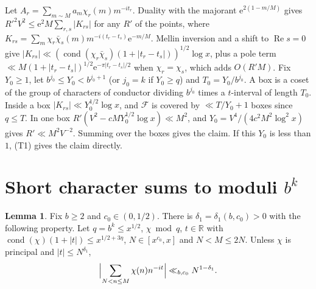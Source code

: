 \documentclass[11pt]{amsart}
\makeatletter
\theoremstyle{definition}
\newtheorem{lemma}[theorem]{Lemma}
\numberwithin{equation}{section}
\renewenvironment{proof}[1][\proofname]{\par\pushQED{\qed}\normalfont\topsep6\p@\@plus6\p@\relax\trivlist\item[\hskip\labelsep\upshape#1.]\ignorespaces}{\popQED\endtrivlist\@endpefalse}
\newcommand{\e}{\mathrm{e}}
\newcommand{\cF}{\mathcal{F}}
\newcommand{\cond}{\operatorname{cond}}
\makeatother
\begin{document}
\begin{proof}[Proof of (T2)]
Let $A_r=\sum_{m\sim M}a_m\chi_r(m)m^{-it_r}$. Duality with the majorant $\e^{2(1-m/M)}$ gives $R'^2V^2\le\e^2M\sum_{r,s}|K_{rs}|$ for any $R'$ of the points, where $K_{rs}=\sum_m\chi_r\bar\chi_s(m)m^{-i(t_r-t_s)}\e^{-m/M}$. Mellin inversion and a shift to $\operatorname{Re}s=0$ give $|K_{rs}|\ll(\cond(\chi_r\bar\chi_s)(1+|t_r-t_s|))^{1/2}\log x$, plus a pole term $\ll M(1+|t_r-t_s|)^{1/2}\e^{-\pi|t_r-t_s|/2}$ when $\chi_r=\chi_s$, which adds $O(R'M)$. Fix $Y_0\ge1$, let $b^{j_0}\le Y_0<b^{j_0+1}$ (or $j_0=k$ if $Y_0\ge q$) and $T_0=Y_0/b^{j_0}$. A box is a coset of the group of characters of conductor dividing $b^{j_0}$ times a $t$-interval of length $T_0$. Inside a box $|K_{rs}|\ll Y_0^{1/2}\log x$, and $\cF$ is covered by $\ll T/Y_0+1$ boxes since $q\le T$. In one box $R'(V^2-cMY_0^{1/2}\log x)\ll M^2$, and $Y_0=V^4/(4c^2M^2\log^2x)$ gives $R'\ll M^2V^{-2}$. Summing over the boxes gives the claim. If this $Y_0$ is less than $1$, (T1) gives the claim directly.
\end{proof}

\section{Short character sums to moduli $b^k$}\label{sec:I5}

\begin{lemma}\label{lem:I5}
Fix $b\ge2$ and $c_0\in(0,1/2)$. There is $\delta_1=\delta_1(b,c_0)>0$ with the following property. Let $q=b^k\le x^{1/2}$, $\chi\bmod q$, $t\in\mathbb R$ with $\cond(\chi)(1+|t|)\le x^{1/2+3\eta}$, $N\in[x^{c_0},x]$ and $N<M\le2N$. Unless $\chi$ is principal and $|t|\le N^{\delta_1}$,
\[
\Bigl|\sum_{N<n\le M}\chi(n)n^{-it}\Bigr|\ll_{b,c_0}N^{1-\delta_1}.
\]
\end{lemma}
\end{document}
